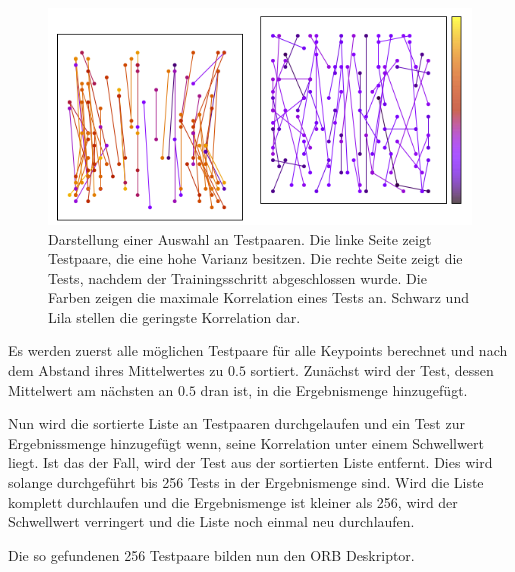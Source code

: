 \begin{figure}[h]

    \centering
		\includegraphics[scale=0.5]{bilder/orbPairs.png}
    	\caption{Darstellung einer Auswahl an Testpaaren. Die linke Seite zeigt Testpaare, die eine hohe Varianz besitzen. Die rechte Seite zeigt die Tests, nachdem der Trainingsschritt abgeschlossen wurde. Die Farben zeigen die maximale Korrelation eines Tests an. Schwarz und Lila stellen die geringste Korrelation dar. }
\label{fig:orbPairs}
\end{figure}

Es werden zuerst alle möglichen Testpaare für alle Keypoints berechnet und nach dem Abstand ihres Mittelwertes zu $0.5$ sortiert. 
Zunächst wird der Test, dessen Mittelwert am nächsten an $0.5$ dran ist, in die Ergebnismenge hinzugefügt.


Nun wird die sortierte Liste an Testpaaren durchgelaufen und ein Test zur Ergebnissmenge hinzugefügt wenn, seine Korrelation unter einem Schwellwert liegt. Ist das der Fall, wird der Test aus der sortierten Liste entfernt. Dies wird solange durchgeführt bis 256 Tests in der Ergebnismenge sind. 
Wird die Liste komplett durchlaufen und die Ergebnismenge ist kleiner als 256, wird der Schwellwert verringert und die Liste noch einmal neu durchlaufen.

Die so gefundenen 256 Testpaare bilden nun den ORB Deskriptor.
